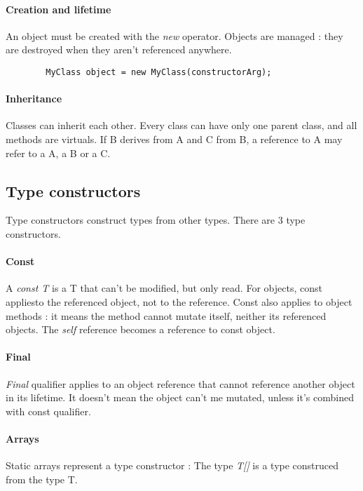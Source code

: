 \documentclass[a4paper, 12pt]{article}
\begin{document}
	\paragraph{Creation and lifetime}
	An object must be created with the \textit{new} operator. Objects are managed : they are destroyed when they aren't referenced anywhere.
	\begin{verbatim}
		MyClass object = new MyClass(constructorArg);
	\end{verbatim}
	\paragraph{Inheritance}
	Classes can inherit each other. Every class can have only one parent class, and all methods are virtuals. If B derives from A and C from B, a reference to A may refer to a A, a B or a C.
	
	\subsection{Type constructors}
	Type constructors construct types from other types. There are 3 type constructors.
	\paragraph{Const}
	A \textit{const T} is a T that can't be modified, but only read. For objects, const appliesto the referenced object, not to the reference.
	Const also applies to object methods : it means the method cannot mutate itself, neither its referenced objects. The \textit{self} reference becomes a reference to const object.
	\paragraph{Final}
	\textit{Final} qualifier applies to an object reference that cannot reference another object in its lifetime. It doesn't mean the object can't me mutated, unless it's combined with const qualifier.
	\paragraph{Arrays}
	Static arrays represent a type constructor : The type \textit{T[]} is a type construced from the type T.

	
\end{document}
